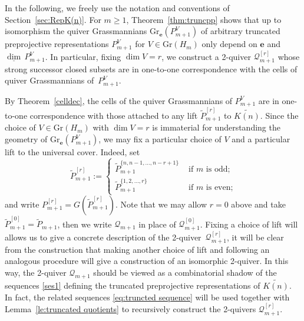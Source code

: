 \documentclass{amsart}
\newtheorem{remark}[theorem]{Remark}
\numberwithin{equation}{section}
\newcommand{\bfe}{\mathbf{e}}
\newcommand{\cQ}{\mathcal{Q}}
\newcommand\udim{{\underline{\dim}\, }}
\newcommand{\Gr}{\mathrm{Gr}}
\begin{document}

In the following, we freely use the notation and conventions of Section~\ref{sec:RepK(n)}.
For $m\ge1$, Theorem~\ref{thm:truncpp} shows that up to isomorphism the quiver Grassmannians $\Gr_\bfe(P_{m+1}^V)$ of arbitrary truncated preprojective representations $P_{m+1}^V$ for $V\in\Gr(H_m)$ only depend on $\bfe$ and $\udim P_{m+1}^V$.
In particular, fixing $\dim V=r$, we construct a 2-quiver $\cQ_{m+1}^{[r]}$ whose strong successor closed subsets are in one-to-one correspondence with the cells of quiver Grassmannians of~$P_{m+1}^V$.

By Theorem~\ref{celldec}, the cells of the quiver Grassmannians of $P_{m+1}^V$ are in one-to-one correspondence with those attached to any lift $\tilde P_{m+1}^{[r]}$ to $\widetilde{K(n)}$.
Since the choice of $V\in\Gr(H_m)$ with $\dim V=r$ is immaterial for understanding the geometry of $\Gr_\bfe(P_{m+1}^V)$, we may fix a particular choice of $V$ and a particular lift to the universal cover.
Indeed, set
\[\tilde P_{m+1}^{[r]}:=
  \begin{cases}
    \tilde P_{m+1}^{\{n,n-1,\ldots,n-r+1\}} & \text{ if $m$ is odd;}\\
    \tilde P_{m+1}^{\{1,2,\ldots,r\}} & \text{ if $m$ is even;}
  \end{cases}\] 
and write $P_{m+1}^{[r]}=G(\tilde P_{m+1}^{[r]})$.
Note that we may allow $r=0$ above and take $\tilde P_{m+1}^{[0]}=\tilde P_{m+1}$, then we write $\cQ_{m+1}$ in place of $\cQ_{m+1}^{[0]}$.
Fixing a choice of lift will allows us to give a concrete description of the 2-quiver~$\cQ_{m+1}^{[r]}$, it will be clear from the construction that making another choice of lift and following an analogous procedure will give a construction of an isomorphic 2-quiver.
In this way, the 2-quiver $\cQ_{m+1}$ should be viewed as a combinatorial shadow of the sequences \eqref{ses1} defining the truncated preprojective representations of $\widetilde{K(n)}$.
In fact, the related sequences \eqref{eq:truncted sequence} will be used together with Lemma~\ref{le:truncated quotients} to recursively construct the 2-quivers $\cQ_{m+1}^{[r]}$.
\end{document}
